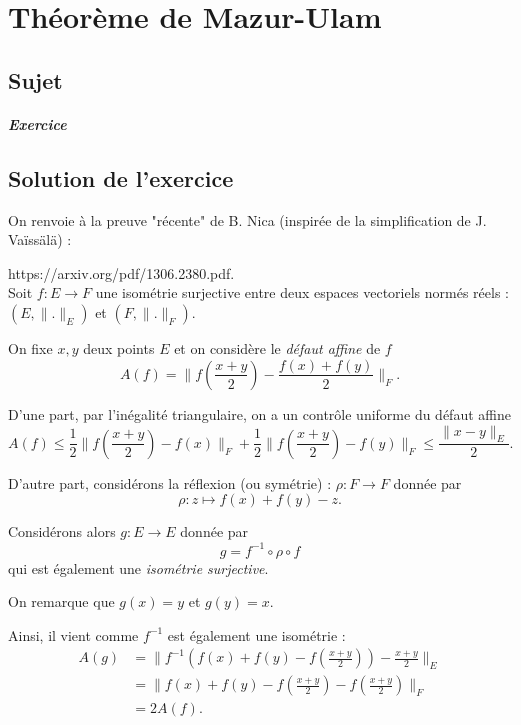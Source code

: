 \chapter{Théorème de Mazur-Ulam}

\section{Sujet}

\paragraph{Exercice}

\section{Solution de l'exercice}

On renvoie à la preuve "récente" de B. Nica (inspirée de la simplification de J. Vaïssälä) :

https://arxiv.org/pdf/1306.2380.pdf.\\

Soit $f : E \rightarrow F$ une isométrie surjective entre deux espaces vectoriels normés réels : $(E,\|.\|_{E})$ et $(F,\|.\|_{F}).$

On fixe $x,y$ deux points $E$ et on considère le \emph{défaut affine} de $f$ $$A(f)=\|f(\frac{x+y}{2})-\frac{f(x)+f(y)}{2}\|_{F}.$$

D'une part, par l'inégalité triangulaire, on a un contrôle uniforme du défaut affine $$A(f)\leq \frac{1}{2}\|f(\frac{x+y}{2})-f(x)\|_{F}+\frac{1}{2}\|f(\frac{x+y}{2})-f(y)\|_{F}\leq \frac{\|x-y\|_{E}}{2}.$$

D'autre part, considérons la réflexion (ou symétrie) : $\rho : F \rightarrow F$ donnée par $$\rho : z \mapsto f(x)+f(y)-z.$$

Considérons alors $g : E \rightarrow E$ donnée par $$g=f^{-1}\circ \rho\circ f$$ qui est également une \emph{isométrie surjective}. 

On remarque que $g(x)=y$ et $g(y)=x.$

Ainsi, il vient comme $f^{-1}$ est également une isométrie : 
\begin{align*}
A(g) & = \|f^{-1}\left( f(x)+f(y)-f(\frac{x+y}{2})\right)-\frac{x+y}{2}\|_{E}\\
& = \|f(x)+f(y)-f(\frac{x+y}{2})-f(\frac{x+y}{2})\|_{F}\\
& = 2A(f).
\end{align*}

